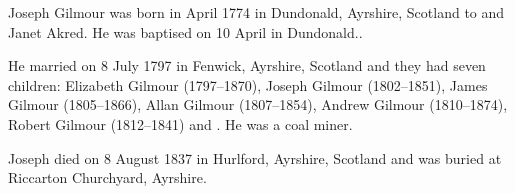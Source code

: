 
Joseph Gilmour was born in April 1774 in Dundonald, Ayrshire, Scotland to  and 
Janet Akred. He was baptised on 10 April in Dundonald.\cite{JosephGilmourBirth}.

He married  on 8 July 1797 in Fenwick, Ayrshire, Scotland and they had seven children: Elizabeth Gilmour (1797--1870), Joseph Gilmour (1802--1851), James Gilmour (1805--1866), Allan Gilmour (1807--1854), Andrew Gilmour (1810--1874), Robert Gilmour (1812--1841) and .
He was a coal miner.

Joseph died on 8 August 1837 in Hurlford, Ayrshire, Scotland and was buried at Riccarton Churchyard, Ayrshire.\cite{JosephGilmourDeath}
